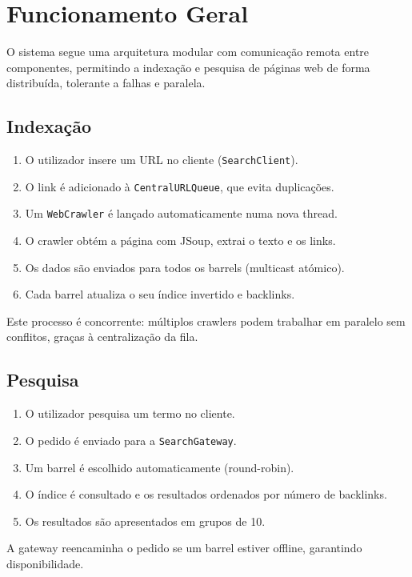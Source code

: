 \documentclass{article}
\begin{document}
\newpage
\section{Funcionamento Geral}

O sistema segue uma arquitetura modular com comunicação remota entre componentes, permitindo a indexação e pesquisa de páginas web de forma distribuída, tolerante a falhas e paralela.

\subsection{Indexação}

\begin{enumerate}
    \item O utilizador insere um URL no cliente (\texttt{SearchClient}).
    \item O link é adicionado à \texttt{CentralURLQueue}, que evita duplicações.
    \item Um \texttt{WebCrawler} é lançado automaticamente numa nova thread.
    \item O crawler obtém a página com JSoup, extrai o texto e os links.
    \item Os dados são enviados para todos os barrels (multicast atómico).
    \item Cada barrel atualiza o seu índice invertido e backlinks.
\end{enumerate}

Este processo é concorrente: múltiplos crawlers podem trabalhar em paralelo sem conflitos, graças à centralização da fila.

\subsection{Pesquisa}

\begin{enumerate}
    \item O utilizador pesquisa um termo no cliente.
    \item O pedido é enviado para a \texttt{SearchGateway}.
    \item Um barrel é escolhido automaticamente (round-robin).
    \item O índice é consultado e os resultados ordenados por número de backlinks.
    \item Os resultados são apresentados em grupos de 10.
\end{enumerate}

A gateway reencaminha o pedido se um barrel estiver offline, garantindo disponibilidade.
\end{document}

